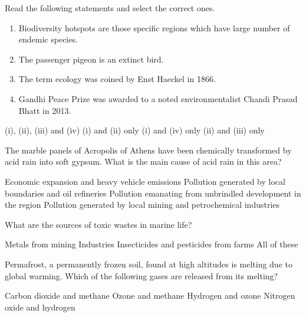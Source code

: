\begin{questions}
    \question Read the following statements and select the correct ones.
    \begin{enumerate}[align=left,label=\roman*.]
        \item Biodiversity hotspots are those specific regions which have large number of endemic species.
        \item The passenger pigeon is an extinct bird.
        \item The term ecology was coined by Enst Haeckel in 1866.
        \item Gandhi Peace Prize was awarded to a noted environmentalist Chandi Prasad Bhatt in 2013.
    \end{enumerate}
    \begin{randomizeoneparchoices}
        \CorrectChoice (i), (ii), (iii) and (iv)
        \choice (i) and (ii) only
        \choice (i) and (iv) only
        \choice (ii) and (iii) only
    \end{randomizeoneparchoices}

    \question The marble panels of Acropolis of Athens have been chemically transformed by acid rain into soft gypsum. What is the main cause of acid rain in this area?

    \begin{randomizechoices}
        \CorrectChoice Economic expansion and heavy vehicle emissions
        \choice Pollution generated by local boundaries and oil refineries
        \choice Pollution emanating from unbrindled development in the region
        \choice Pollution generated by local mining and petrochemical industries
    \end{randomizechoices}

    \question What are the sources of toxic wastes in marine life?

    \begin{choices}
        \choice Metals from mining
        \choice Industries
        \choice Insecticides and pesticides from farms
        \CorrectChoice All of these
    \end{choices}

    \question Permafrost, a permanently frozen soil, found at high altitudes is melting due to global warming. Which of the following gases are released from its melting?

    \begin{randomizeoneparchoices}
        \CorrectChoice Carbon dioxide and methane
        \choice Ozone and methane
        \choice Hydrogen and ozone
        \choice Nitrogen oxide and hydrogen
    \end{randomizeoneparchoices}


\end{questions}
